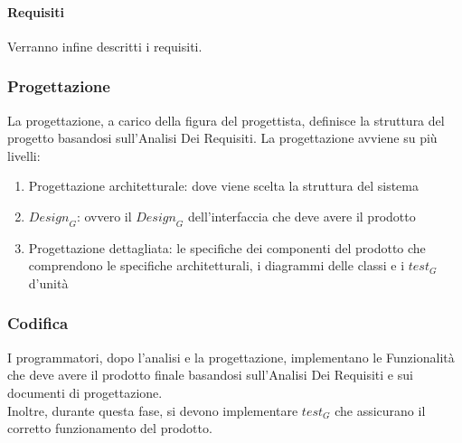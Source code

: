 \paragraph{Requisiti} 
Verranno infine descritti i requisiti.
\subsubsection{Progettazione}
La progettazione, a carico della figura del progettista, definisce la struttura del progetto basandosi sull'Analisi Dei Requisiti.
La progettazione avviene su più livelli:
\begin{enumerate}
    \item Progettazione architetturale: dove viene scelta la struttura del sistema
    \item $\textit{Design}_G$: ovvero il $\textit{Design}_G$ dell'interfaccia che deve avere il prodotto
    \item Progettazione dettagliata: le specifiche dei componenti del prodotto che comprendono le specifiche architetturali, i diagrammi delle classi e i $\textit{test}_G$ d'unità
\end{enumerate}
\subsubsection{Codifica}
I programmatori, dopo l'analisi e la progettazione, implementano le Funzionalità che deve avere il prodotto finale basandosi sull'Analisi Dei Requisiti e sui documenti di progettazione.\\
Inoltre, durante questa fase, si devono implementare $\textit{test}_G$ che assicurano il corretto funzionamento del prodotto.